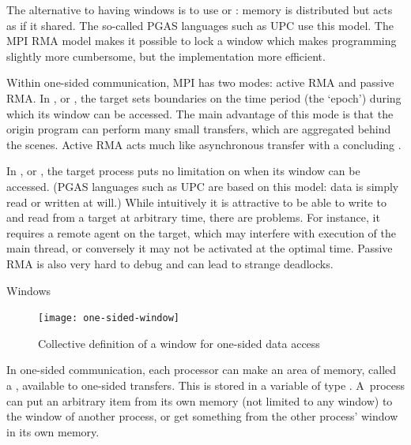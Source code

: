 The alternative to having windows is to use 
or : memory is distributed but acts as if
it shared. The so-called \acf{PGAS} languages such as \ac{UPC} use this model.
The MPI \ac{RMA} model makes it possible to 
lock a window which makes programming slightly more cumbersome, but the
implementation more efficient.

Within one-sided communication, MPI has two modes: active RMA and
passive RMA. In , or ,
the target sets boundaries on the time period (the `epoch')
during which its window can be accessed.
The main advantage
of this mode is that the origin program can perform many small transfers, which are
aggregated behind the scenes. Active RMA acts much like asynchronous transfer with a
concluding .

In , or ,
the target process puts no limitation on when its window can be accessed.
(\ac{PGAS} languages such as \ac{UPC} are based on this model: data is 
simply read or written at will.)
While 
intuitively it is attractive to be able to write to and read from a target at
arbitrary time,
there are problems. For instance, it requires a remote agent on the target,
which may interfere with execution of the main thread, or conversely it may not be
activated at the optimal time. Passive RMA is also very hard to debug and can lead
to strange deadlocks.


 {Windows}
\label{sec:windows}

\begin{figure}[ht]
  \texttt{[image: one-sided-window]}
  \caption{Collective definition of a window for one-sided data access}
  \label{fig:window}
\end{figure}

In one-sided communication, each processor can make an area of memory,
called a , available to one-sided transfers.
%
This is stored in a variable of type .
%
A~process can put an arbitrary item from its own memory
(not limited to any window) to the window of another process,
or get something from the other process'
window in its own memory.


